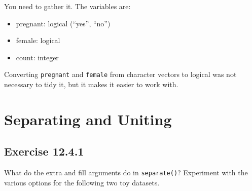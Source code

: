 \documentclass[]{book}
\newenvironment{Shaded}{\begin{snugshade}}{\end{snugshade}}
\newcommand{\CommentTok}[1]{\textcolor[rgb]{0.56,0.35,0.01}{\textit{#1}}}
\newcommand{\DataTypeTok}[1]{\textcolor[rgb]{0.13,0.29,0.53}{#1}}
\newcommand{\KeywordTok}[1]{\textcolor[rgb]{0.13,0.29,0.53}{\textbf{#1}}}
\newcommand{\NormalTok}[1]{#1}
\newcommand{\OperatorTok}[1]{\textcolor[rgb]{0.81,0.36,0.00}{\textbf{#1}}}
\newcommand{\StringTok}[1]{\textcolor[rgb]{0.31,0.60,0.02}{#1}}
\providecommand{\tightlist}{%
  \setlength{\itemsep}{0pt}\setlength{\parskip}{0pt}}
\theoremstyle{plain}
\theoremstyle{remark}
\begin{document}
You need to gather it. The variables are:

\begin{itemize}
\tightlist
\item
  pregnant: logical (``yes'', ``no'')
\item
  female: logical
\item
  count: integer
\end{itemize}

\begin{Shaded}
\end{Shaded}

Converting \texttt{pregnant} and \texttt{female} from character vectors
to logical was not necessary to tidy it, but it makes it easier to work
with.

\hypertarget{separating-and-uniting}{%
\section{Separating and Uniting}\label{separating-and-uniting}}

\hypertarget{exercise-12.4.1}{%
\subsection*{\texorpdfstring{Exercise
{12.4.1}}{Exercise 12.4.1}}\label{exercise-12.4.1}}

What do the extra and fill arguments do in \texttt{separate()}?
Experiment with the various options for the following two toy datasets.
\end{document}
